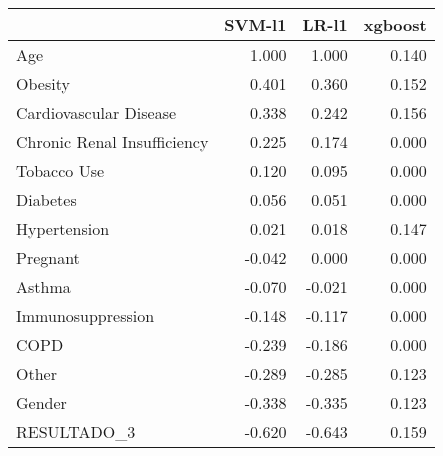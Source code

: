 \begin{tabular}{lrrr}
\toprule
{} &  SVM-l1 &  LR-l1 &  xgboost \\
\midrule
Age                         &   1.000 &  1.000 &    0.140 \\
Obesity                     &   0.401 &  0.360 &    0.152 \\
Cardiovascular Disease      &   0.338 &  0.242 &    0.156 \\
Chronic Renal Insufficiency &   0.225 &  0.174 &    0.000 \\
Tobacco Use                 &   0.120 &  0.095 &    0.000 \\
Diabetes                    &   0.056 &  0.051 &    0.000 \\
Hypertension                &   0.021 &  0.018 &    0.147 \\
Pregnant                    &  -0.042 &  0.000 &    0.000 \\
Asthma                      &  -0.070 & -0.021 &    0.000 \\
Immunosuppression           &  -0.148 & -0.117 &    0.000 \\
COPD                        &  -0.239 & -0.186 &    0.000 \\
Other                       &  -0.289 & -0.285 &    0.123 \\
Gender                      &  -0.338 & -0.335 &    0.123 \\
RESULTADO\_3                 &  -0.620 & -0.643 &    0.159 \\
\bottomrule
\end{tabular}
